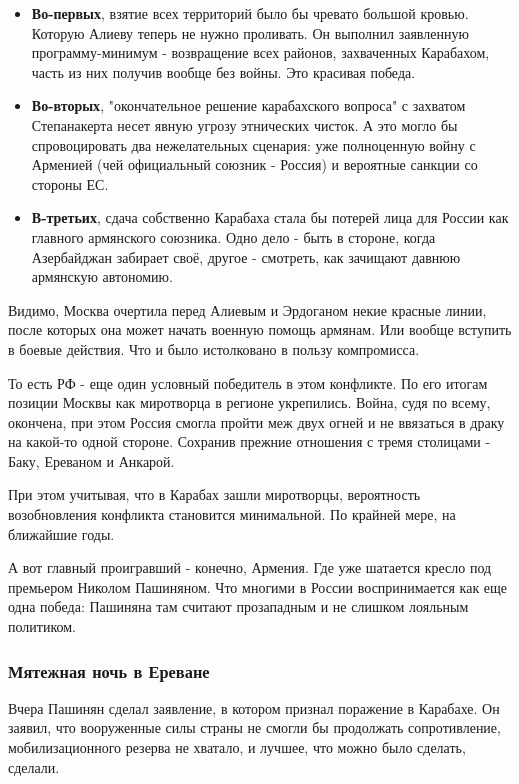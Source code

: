 \begin{itemize}
\item \textbf{Во-первых}, взятие всех территорий было бы чревато большой
				кровью. Которую Алиеву теперь не нужно проливать. Он выполнил
				заявленную программу-минимум - возвращение всех районов, захваченных
				Карабахом, часть из них получив вообще без войны. Это красивая победа. 

\item \textbf{Во-вторых}, "окончательное решение карабахского вопроса" с
				захватом Степанакерта несет явную угрозу этнических чисток. А это могло
				бы спровоцировать два нежелательных сценария: уже полноценную войну с
				Арменией (чей официальный союзник - Россия) и вероятные санкции со
				стороны ЕС. 

\item \textbf{В-третьих}, сдача собственно Карабаха стала бы потерей лица для
				России как главного армянского союзника. Одно дело - быть в стороне,
				когда Азербайджан забирает своё, другое - смотреть, как зачищают давнюю
				армянскую автономию.
\end{itemize}

Видимо, Москва очертила перед Алиевым и Эрдоганом некие красные линии, после
которых она может начать военную помощь армянам. Или вообще вступить в боевые
действия. Что и было истолковано в пользу компромисса. 

То есть РФ - еще один условный победитель в этом конфликте. По его итогам
позиции Москвы как миротворца в регионе укрепились. Война, судя по всему,
окончена, при этом Россия смогла пройти меж двух огней и не ввязаться в драку
на какой-то одной стороне. Сохранив прежние отношения с тремя столицами - Баку,
Ереваном и Анкарой. 

При этом учитывая, что в Карабах зашли миротворцы, вероятность возобновления
конфликта становится минимальной. По крайней мере, на ближайшие годы. 

А вот главный проигравший - конечно, Армения. Где уже шатается кресло под
премьером Николом Пашиняном. Что многими в России воспринимается как еще одна
победа: Пашиняна там считают прозападным и не слишком лояльным политиком. 

\subsubsection{Мятежная ночь в Ереване}

Вчера Пашинян сделал заявление, в котором признал поражение в Карабахе. Он
заявил, что вооруженные силы страны не смогли бы продолжать сопротивление,
мобилизационного резерва не хватало, и лучшее, что можно было сделать, сделали. 

